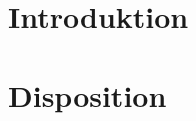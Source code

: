 \section*{Introduktion}
\begin{frame}





\end{frame}


\section*{Disposition}
\begin{frame}





\end{frame}